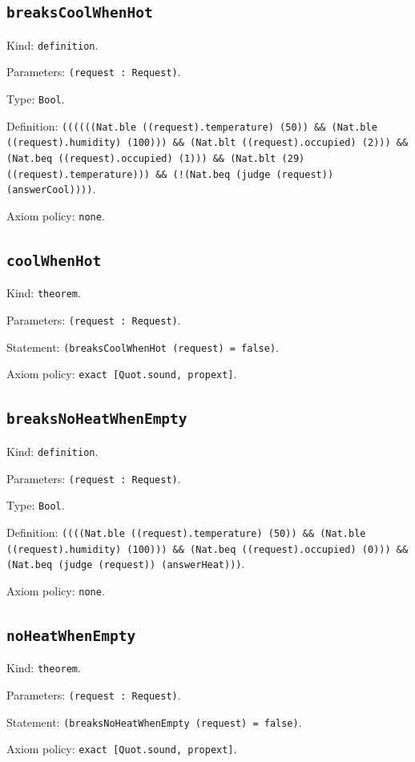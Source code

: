 \documentclass[11pt]{article}
\begin{document}
\subsection*{\texttt{breaksCoolWhenHot}}
\noindent Kind: \texttt{definition}.\par
\noindent Parameters: \texttt{(request : Request)}.\par
\noindent Type: \texttt{Bool}.\par
\noindent Definition: \texttt{((((((Nat.ble ((request).temperature) (50)) \&\& (Nat.ble ((request).humidity) (100))) \&\& (Nat.blt ((request).occupied) (2))) \&\& (Nat.beq ((request).occupied) (1))) \&\& (Nat.blt (29) ((request).temperature))) \&\& (!(Nat.beq (judge (request)) (answerCool))))}.\par
\noindent Axiom policy: \texttt{none}.\par
\subsection*{\texttt{coolWhenHot}}
\noindent Kind: \texttt{theorem}.\par
\noindent Parameters: \texttt{(request : Request)}.\par
\noindent Statement: \texttt{(breaksCoolWhenHot (request) = false)}.\par
\noindent Axiom policy: \texttt{exact [Quot.sound, propext]}.\par
\subsection*{\texttt{breaksNoHeatWhenEmpty}}
\noindent Kind: \texttt{definition}.\par
\noindent Parameters: \texttt{(request : Request)}.\par
\noindent Type: \texttt{Bool}.\par
\noindent Definition: \texttt{((((Nat.ble ((request).temperature) (50)) \&\& (Nat.ble ((request).humidity) (100))) \&\& (Nat.beq ((request).occupied) (0))) \&\& (Nat.beq (judge (request)) (answerHeat)))}.\par
\noindent Axiom policy: \texttt{none}.\par
\subsection*{\texttt{noHeatWhenEmpty}}
\noindent Kind: \texttt{theorem}.\par
\noindent Parameters: \texttt{(request : Request)}.\par
\noindent Statement: \texttt{(breaksNoHeatWhenEmpty (request) = false)}.\par
\noindent Axiom policy: \texttt{exact [Quot.sound, propext]}.\par
\end{document}
